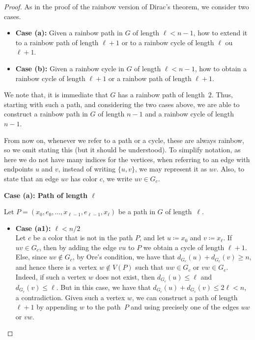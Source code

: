 \begin{proof} %

As in the proof of the rainbow version of Dirac's theorem, we consider two cases.

\begin{itemize}
  
\item[]\textbf{Case (a):} Given a rainbow path in $G$ of length $\ell < n-1$, how to extend it to a rainbow path
of length $\ell +1 $ or to a rainbow cycle of length $\ell$ ou $\ell + 1$. \\

\item[]\textbf{Case (b):} Given a rainbow cycle in $G$ of length $\ell < n-1$, how to obtain a rainbow cycle of length $\ell + 1$ or a rainbow path of length $\ell + 1$.

\end{itemize}

\smallskip

We note that, it is immediate that $G$ has a rainbow path of length~$2$. Thus, starting with such a path,
and considering the two cases above, we are able to construct a rainbow path in $G$ of length $n-1$
and a rainbow  cycle of length $n-1$. 

From now on, whenever we refer to a path or a cycle, these are always
rainbow, so we omit stating this (but it should be understood). To
simplify notation, as here we do not have many indices for the
vertices, when  referring to an edge with endpoints $u$ and $v$, instead of 
writing  $\{u,v\}$, we may represent it as $uv$.  Also, to state that
an edge $uv$ has color $c$, we write $uv \in G_c$.

\bigskip


\ni \textbf{Case (a):  Path of length $\ell$}


Let $P = (x_0, e_0, \dots, x_{\ell-1}, e_{\ell-1}, x_{\ell})$ be a
path in $G$ of length~$\ell$. \\

\smallskip

\begin{itemize}
  
\item[]\textbf{Case (a1): \(\ell < n/2 \)} \\


Let \( c \) be a color that is not in the path $P$, and let  \(u \coloneqq x_0\) and \(v \coloneqq x_{\ell}\). 
If \(uv \in G_c \), then by adding the edge $vu$ to $P$ we obtain a cycle of length \(\ell+1 \).
% 
Else, since \( uv \not\in G_c \), by Ore's condition, we have that
\( d_{G_c}(u) + d_{G_c}(v) \geq n \), and hence there is a
vertex \( w \notin V(P)\) such that \( uw \in G_c \) or
\( vw \in G_c \). Indeed, if such a vertex $w$ does not exist, then
\( d_{G_c}(u) \leq \ell \) and \( d_{G_c}(v) \leq \ell \). But
in this case, we have that 
\( d_{G_c}(u) + d_{G_c}(v) \leq 2\ell < n \), a contradiction.
Given such a vertex \(w\), we can construct a path of length \(\ell+1 \)
by appending $w$ to the path~$P$ and using precisely one of the edges \(uw\) or \(vw\).\\ 



\end{itemize}
\end{proof}
